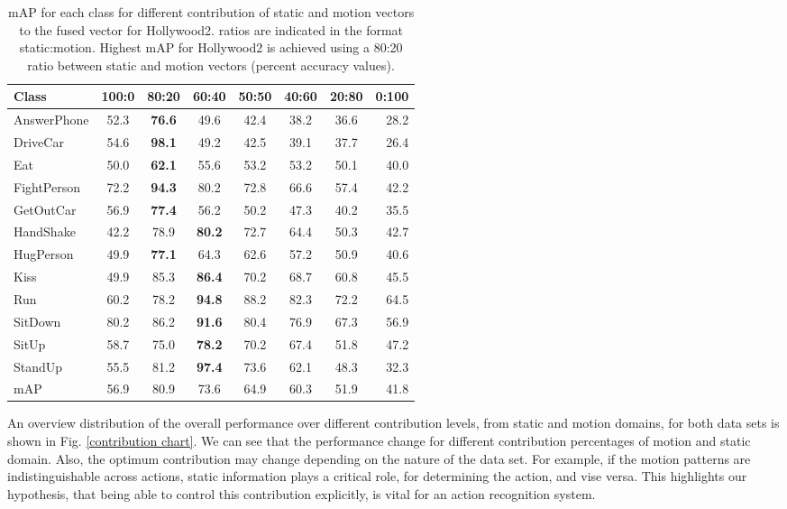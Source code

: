 \begin{table}[]
\centering
\caption{mAP for each class for different contribution of static and motion vectors to the fused vector for Hollywood2. ratios are indicated in the
format static:motion. Highest mAP for Hollywood2 is achieved using a
80:20 ratio between static and motion vectors (percent accuracy values).}\label{tbl:rho hollywood2}
\begin{tabular}{@{} l c c c c c c r @{} }
\toprule
Class           & 100:0 & 80:20 & 60:40 & 50:50 & 40:60 & 20:80 & 0:100 \\ \midrule \midrule
AnswerPhone     & 52.3& \textbf{76.6}& 49.6& 42.4& 38.2& 36.6& 28.2        \\
DriveCar        & 54.6& \textbf{98.1}& 49.2& 42.5& 39.1& 37.7& 26.4            \\
Eat             & 50.0& \textbf{62.1}& 55.6& 53.2& 53.2& 50.1& 40.0           \\
FightPerson     & 72.2& \textbf{94.3}& 80.2& 72.8& 66.6& 57.4& 42.2  \\
GetOutCar       & 56.9& \textbf{77.4}& 56.2& 50.2& 47.3& 40.2& 35.5\\
HandShake       & 42.2& 78.9& \textbf{80.2}& 72.7& 64.4& 50.3& 42.7 \\
HugPerson       & 49.9& \textbf{77.1}& 64.3& 62.6& 57.2& 50.9& 40.6 \\
Kiss            & 49.9& 85.3& \textbf{86.4}& 70.2& 68.7& 60.8& 45.5 \\
Run             & 60.2& 78.2& \textbf{94.8}& 88.2& 82.3& 72.2& 64.5  \\
SitDown         & 80.2& 86.2& \textbf{91.6}& 80.4& 76.9& 67.3& 56.9  \\
SitUp           & 58.7& 75.0& \textbf{78.2}& 70.2& 67.4& 51.8& 47.2 \\
StandUp         & 55.5& 81.2& \textbf{97.4}& 73.6& 62.1& 48.3& 32.3 \\ \midrule
mAP             & 56.9& 80.9   &  73.6    &  64.9   &    60.3   &   51.9    &  41.8\\ \bottomrule

\end{tabular}
\end{table}

An overview distribution of the overall performance over different contribution levels, from static and motion domains, for both data sets is shown in Fig. \ref{contribution chart}.
We can see that the performance change for different contribution percentages of motion and static domain. Also, the optimum contribution may change
depending on the nature of the data set. For example, if the motion patterns are indistinguishable across actions, static information plays
a critical role, for determining the action, and vise versa. This highlights
our hypothesis, that being able to control this contribution explicitly, is vital for an action recognition system.


